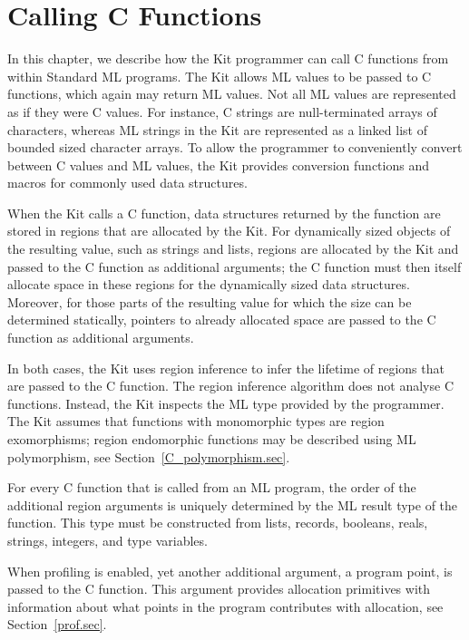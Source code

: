 \documentclass[12pt]{book}
\begin{document}
\chapter{Calling C Functions}
\label{ccall.sec}

In this chapter, we describe how the Kit programmer can call 
%
C functions from within Standard ML programs.  The Kit allows ML
values to be passed to C functions, which again may return ML values.
Not all ML values are represented as if they were C values. For
instance, C strings are null-terminated arrays of characters, whereas
ML strings in the Kit are represented as a linked list of bounded
sized character arrays. To allow the programmer to conveniently
convert between C values and ML values, the Kit provides conversion
functions and macros for commonly used data structures.

When the Kit calls a C function, data structures returned by the
function are stored in regions that are allocated by the Kit. For
dynamically sized objects of the resulting value, such as strings and
lists, regions are allocated by the Kit and passed to the C function
as additional arguments; the C function must then itself allocate
space in these regions for the dynamically sized data
structures. Moreover, for those parts of the resulting value for which
the size can be determined statically, pointers to already allocated
space are passed to the C function as additional arguments.

In both cases, the Kit uses region inference to infer the lifetime of
regions that are passed to the C function.  The region inference
algorithm does not analyse C functions. Instead, the Kit inspects the
ML type provided by the programmer. The Kit assumes that functions
with monomorphic types are 
%
region exomorphisms;
%
region endomorphic functions may be described using ML polymorphism,
see Section~\ref{C_polymorphism.sec}.

For every C function that is called from an ML program, the order of the
additional region arguments is uniquely determined by the ML result type
of the function.  This type must be constructed from lists, records,
booleans, reals, strings, integers, and type variables.

When profiling is enabled, yet another additional argument, a program
point, is passed to the C function. This argument provides allocation
primitives with information about what points in the program
contributes with allocation, see Section~\ref{prof.sec}.
\end{document}
